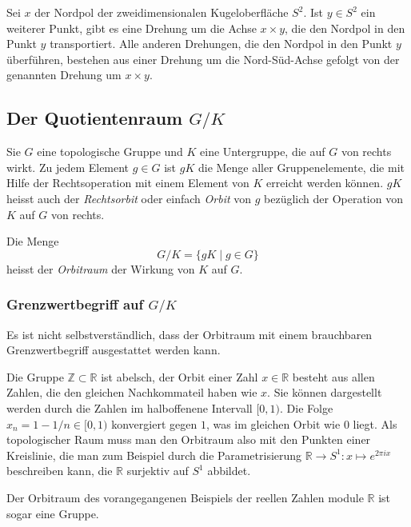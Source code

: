 \begin{beispiel}
Sei $x$ der Nordpol der zweidimensionalen Kugeloberfläche $S^2$.
Ist $y\in S^2$ ein weiterer Punkt, gibt es eine Drehung um die Achse
$x\times y$, die den Nordpol in den Punkt $y$ transportiert.
Alle anderen Drehungen, die den Nordpol in den Punkt $y$ überführen,
bestehen aus einer Drehung um die Nord-Süd-Achse gefolgt von der
genannten Drehung um $x\times y$.
\end{beispiel}

%
%
\subsection{Der Quotientenraum $G/K$
\label{buch:nichtkomm:homogen:subsection:quotientgk}}
Sie $G$ eine topologische Gruppe und $K$ eine Untergruppe, die auf $G$
von rechts wirkt.
Zu jedem Element $g\in G$ ist $gK$ die Menge aller Gruppenelemente, 
die mit Hilfe der Rechtsoperation mit einem Element von $K$ erreicht
werden können.
$gK$ heisst auch der {\em Rechtsorbit} oder einfach {\em Orbit} von $g$
bezüglich der Operation von $K$ auf $G$ von rechts.

\begin{definition}
Die Menge 
\[
G/K
=
\{ gK \mid g\in G\}
\]
heisst der {\em Orbitraum} der Wirkung von $K$ auf $G$.
\end{definition}

%
%
\subsubsection{Grenzwertbegriff auf $G/K$}
Es ist nicht selbstverständlich, dass der Orbitraum
mit einem brauchbaren Grenzwertbegriff ausgestattet
werden kann.

\begin{beispiel}
Die Gruppe $\mathbb{Z}\subset\mathbb{R}$ ist abelsch, der Orbit einer
Zahl $x\in\mathbb{R}$ besteht aus allen Zahlen, die den gleichen
Nachkommateil haben wie $x$.
Sie können dargestellt werden durch die Zahlen im halboffenene
Intervall $[0,1)$.
Die Folge $x_n = 1-1/n\in [0,1)$ konvergiert gegen $1$, was im gleichen
Orbit wie $0$ liegt.
Als topologischer Raum muss man den Orbitraum also mit den
Punkten einer Kreislinie, die man zum Beispiel durch die
Parametrisierung $\mathbb{R}\to S^1:x\mapsto e^{2\pi ix}$ 
beschreiben kann, die $\mathbb{R}$ surjektiv auf $S^1$ abbildet.
\end{beispiel}

Der Orbitraum des vorangegangenen Beispiels der reellen Zahlen
module $\mathbb{R}$ ist sogar eine Gruppe.

